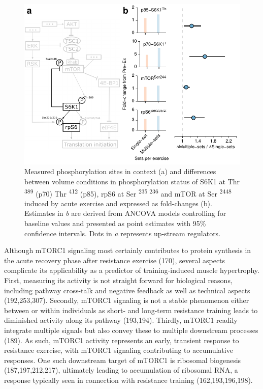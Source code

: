 \documentclass[twoside,10pt]{gihclass} %
\begin{document}
\begin{figure}

{\centering \includegraphics{thesis_files/figure-latex/mtor-fig-1} 

}

\caption[Differences between volume conditions in exercise induced phosphorylation of proteins related to mTORC1 signaling]{Measured phosphorylation sites in context (a) and differences between volume conditions in phosphorylation status of S6K1 at Thr \textsuperscript{389} (p70) Thr \textsuperscript{412} (p85), rpS6 at Ser \textsuperscript{235 236} and mTOR at Ser \textsuperscript{2448} induced by acute exercise and expressed as fold-changes (b). Estimates in \textit{b} are derived from ANCOVA models controlling for baseline values and presented as point estimates with 95\% confidence intervals. Dots in \textit{a} represents up-stream regulators.}\label{fig:mtor-fig}
\end{figure}
Although mTORC1 signaling most certainly contributes to protein synthesis in the acute recovery phase after resistance exercise (170),
several aspects complicate its applicability as a predictor of training-induced muscle hypertrophy.
First, measuring its activity is not straight forward for biological reasons, including pathway cross-talk and negative feedback as well as technical aspects
(192,253,307).
Secondly, mTORC1 signaling is not a stable phenomenon either between or within individuals as short- and long-term resistance training leads to diminished activity along its pathway
(193,194).
Thirdly, mTORC1 readily integrate multiple signals but also convey these to multiple downstream processes
(189).
As such, mTORC1 activity represents an early, transient response to resistance exercise, with mTORC1 signaling contributing to accumulative responses.
One such downstream target of mTORC1 is ribosomal biogenesis
(187,197,212,217),
ultimately leading to accumulation of ribosomal RNA, a response typically seen in connection with resistance training
(162,193,196,198).
\end{document}
